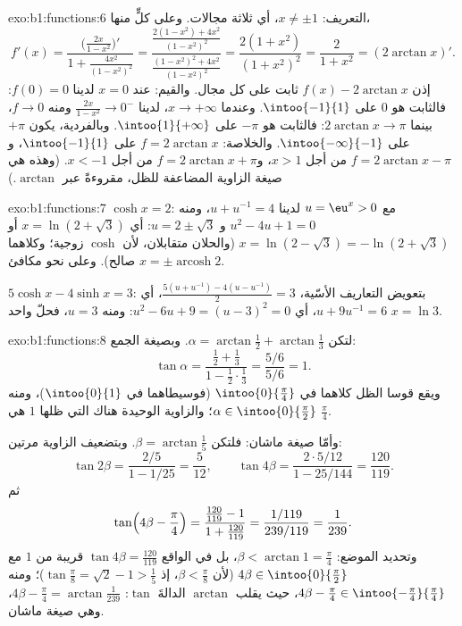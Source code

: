 \begin{solution}{exo:b1:functions:6}
 التعريف: $x \neq \pm 1$، أي ثلاثة مجالات. وعلى كلٍّ منها،
\[
f'(x) = \frac{\bigl(\frac{2x}{1-x^2}\bigr)'}{1 +
\frac{4x^2}{(1-x^2)^2}}
= \frac{\frac{2(1-x^2) + 4x^2}{(1-x^2)^2}}
{\frac{(1-x^2)^2 + 4x^2}{(1-x^2)^2}}
= \frac{2(1 + x^2)}{(1 + x^2)^2} = \frac{2}{1 + x^2}
= (2\arctan x)' .
\]
إذن $f(x) - 2\arctan x$ ثابت على كل مجال. والقيم: عند $x =
0$ لدينا $f(0) = 0$: فالثابت هو $0$ على $\intoo{-1}{1}$. وعندما $x \to
+\infty$، لدينا $\frac{2x}{1-x^2} \to 0^-$ ومنه $f \to 0$، بينما $2\arctan x
\to \pi$: فالثابت هو $-\pi$ على $\intoo{1}{+\infty}$. وبالفردية،
يكون $+\pi$ على $\intoo{-\infty}{-1}$. والخلاصة: $f = 2\arctan x$ على
$\intoo{-1}{1}$، و $f = 2\arctan x - \pi$ من أجل $x > 1$، و$f = 2\arctan x +
\pi$ من أجل $x < -1$. (وهذه هي صيغة الزاوية المضاعفة للظل،
مقروءةً عبر $\arctan$.)
\end{solution}

\begin{solution}{exo:b1:functions:7}
$\cosh x = 2$: مع $u = \eu^x > 0$ لدينا $u + u^{-1} = 4$، ومنه $u^2 - 4u +
1 = 0$ و $u = 2 \pm \sqrt 3$: أي $x = \ln(2 + \sqrt 3)$ أو $x = \ln(2 -
\sqrt 3) = -\ln(2 + \sqrt 3)$ (والحلان متقابلان، لأن
$\cosh$ زوجية؛ وكلاهما صالح). وعلى نحو مكافئ $x = \pm
\operatorname{arcosh} 2$.

$5\cosh x - 4\sinh x = 3$: بتعويض التعاريف الأسّية،
$\frac{5(u + u^{-1}) - 4(u - u^{-1})}{2} = 3$، أي $u + 9u^{-1} =
6$، أي $u^2 - 6u + 9 = (u - 3)^2 = 0$: ومنه $u = 3$، فحلّ واحد $x =
\ln 3$.
\end{solution}

\begin{solution}{exo:b1:functions:8}
لتكن $\alpha = \arctan\frac12 + \arctan\frac13$. وبصيغة الجمع:
\[
\tan\alpha = \frac{\frac12 + \frac13}{1 - \frac12\cdot\frac13}
= \frac{5/6}{5/6} = 1 .
\]
ويقع قوسا الظل كلاهما في $\intoo{0}{\frac\pi4}$ (فوسيطاهما في
$\intoo{0}{1}$)، ومنه $\alpha \in \intoo{0}{\frac\pi2}$؛ والزاوية الوحيدة
هناك التي ظلها $1$ هي $\frac\pi4$.

وأمّا صيغة ماشان: فلتكن $\beta = \arctan\frac15$. وبتضعيف الزاوية مرتين:
\[
\tan 2\beta = \frac{2/5}{1 - 1/25} = \frac{5}{12},
\qquad
\tan 4\beta = \frac{2 \cdot 5/12}{1 - 25/144} = \frac{120}{119}.
\]
ثم
\[
\tan\Bigl(4\beta - \frac\pi4\Bigr)
= \frac{\frac{120}{119} - 1}{1 + \frac{120}{119}}
= \frac{1/119}{239/119} = \frac{1}{239}.
\]
وتحديد الموضع: $\beta < \arctan 1 = \frac\pi4$، بل في الواقع $\tan 4\beta =
\frac{120}{119}$ قريبة من $1$ مع $4\beta \in \intoo{0}{\frac\pi2}$
(لأن $\beta < \frac\pi8$، إذ $\tan\frac\pi8 = \sqrt 2 - 1 > \frac15$)؛
ومنه $4\beta - \frac\pi4 \in \intoo{-\frac\pi4}{\frac\pi4}$، حيث
يقلب $\arctan$ الدالةَ $\tan$: $4\beta - \frac\pi4 =
\arctan\frac{1}{239}$، وهي صيغة ماشان.
\end{solution}

